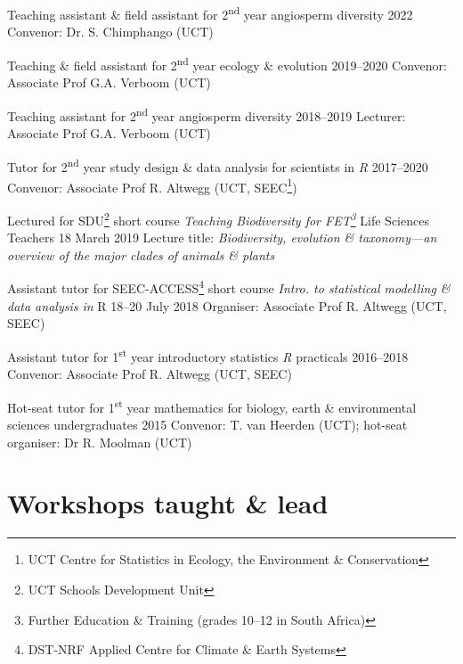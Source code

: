 \documentclass[10pt]{article}
\begin{document}
\begin{hangparas}{2em}{1}

Teaching assistant \& field assistant for 2\textsuperscript{nd} year angiosperm
diversity                                            \hfill 2022 \break
Convenor: Dr. S. Chimphango (UCT)

Teaching \& field assistant for 2\textsuperscript{nd} year ecology \& evolution
                                               \hfill 2019--2020 \break
Convenor: Associate Prof G.A. Verboom (UCT)

Teaching assistant for 2\textsuperscript{nd} year angiosperm diversity
                                               \hfill 2018--2019 \break
Lecturer: Associate Prof G.A. Verboom (UCT)

Tutor for 2\textsuperscript{nd} year study design \& data analysis for 
scientists in \textit{R}                       \hfill 2017--2020 \break
Convenor: Associate Prof R. Altwegg (UCT, SEEC\footnote{UCT Centre for 
Statistics in Ecology, the Environment \& Conservation})

Lectured for SDU\footnote{UCT Schools Development Unit} short course 
\textit{Teaching Biodiversity for FET\footnote{Further Education \& Training
(grades 10--12 in South Africa)}} Life Sciences Teachers
                                            \hfill 18 March 2019 \break
Lecture title: \textit{Biodiversity, evolution \& taxonomy---an overview of the 
major clades of animals \& plants}

Assistant tutor for SEEC-ACCESS\footnote{DST-NRF Applied Centre for Climate \&
Earth Systems} short course \textit{Intro. to statistical modelling \& data 
analysis in} R                           \hfill 18--20 July 2018 \break
Organiser: Associate Prof R. Altwegg (UCT, SEEC)

Assistant tutor for 1\textsuperscript{st} year introductory statistics
\textit{R} practicals                          \hfill 2016--2018 \break
Convenor: Associate Prof R. Altwegg (UCT, SEEC)

Hot-seat tutor for 1\textsuperscript{st} year mathematics for biology, earth \& 
environmental sciences undergraduates                \hfill 2015 \break
Convenor: T. van Heerden (UCT); hot-seat organiser: Dr R. Moolman (UCT)

\hfill

\end{hangparas}

\section*{Workshops taught \& lead} %
\end{document}
